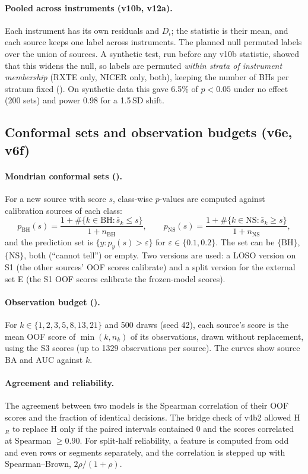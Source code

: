 \paragraph{Pooled across instruments (v10b, v12a).} Each instrument has its own residuals and $D_\iota$; the statistic is
their mean, and each source keeps one label across instruments. The planned null permuted labels over the union of sources.
A synthetic test, run before any v10b statistic, showed that this widens the null, so labels are permuted \emph{within strata
of instrument membership} (RXTE only, NICER only, both), keeping the number of BHs per stratum fixed
(). On synthetic data this gave 6.5\% of $p<0.05$ under no effect (200 sets) and power 0.98 for a
1.5\,SD shift.

\subsection{Conformal sets and observation budgets (v6e, v6f)}\label{sec:conformal}
\paragraph{Mondrian conformal sets ().} For a new source with score $s$, class-wise
$p$-values are computed against calibration sources of each class:
\[
p_\mathrm{BH}(s)=\frac{1+\#\{k\in\mathrm{BH}:\bar s_k\le s\}}{1+n_\mathrm{BH}},\qquad
p_\mathrm{NS}(s)=\frac{1+\#\{k\in\mathrm{NS}:\bar s_k\ge s\}}{1+n_\mathrm{NS}},
\]
and the prediction set is $\{y:p_y(s)>\varepsilon\}$ for $\varepsilon\in\{0.1,0.2\}$. The set can be $\{\mathrm{BH}\}$,
$\{\mathrm{NS}\}$, both (``cannot tell'') or empty. Two versions are used: a LOSO version on S1 (the other sources' OOF
scores calibrate) and a split version for the external set E (the S1 OOF scores calibrate the frozen-model scores).

\paragraph{Observation budget ().} For $k\in\{1,2,3,5,8,13,21\}$ and 500 draws (seed 42), each
source's score is the mean OOF score of $\min(k,n_k)$ of its observations, drawn without replacement, using the S3 scores
(up to 1329 observations per source). The curves show source BA and AUC against $k$.

\paragraph{Agreement and reliability.} The agreement between two models is the Spearman correlation of their OOF scores and
the fraction of identical decisions. The bridge check of v4b2 allowed H$_R$ to replace H only if the paired intervals
contained 0 and the scores correlated at Spearman $\ge0.90$. For split-half reliability, a feature is computed from odd and
even rows or segments separately, and the correlation is stepped up with Spearman--Brown, $2\rho/(1+\rho)$.

